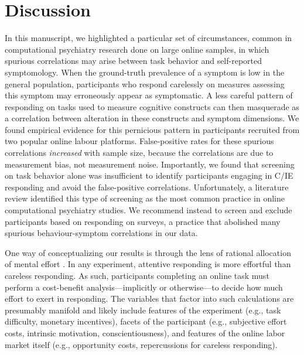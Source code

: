 \documentclass[a4paper,notitlepage,12pt]{article}
\begin{document}
\section{Discussion}

In this manuscript, we highlighted a particular set of circumstances, common in computational psychiatry research done on large online samples, in which spurious correlations may arise between task behavior and self-reported symptomology. When the ground-truth prevalence of a symptom is low in the general population, participants who respond carelessly on measures assessing this symptom may erroneously appear as symptomatic. A less careful pattern of responding on tasks used to measure cognitive constructs can then masquerade as a correlation between alteration in these constructs and symptom dimensions. We found empirical evidence for this pernicious pattern in participants recruited from two popular online labour platforms. False-positive rates for these spurious correlations \emph{increased} with sample size, because the correlations are due to measurement bias, not measurement noise. Importantly, we found that screening on task behavior alone was insufficient to identify participants engaging in C/IE responding and avoid the false-positive correlations. Unfortunately, a literature review identified this type of screening as the most common practice in online computational psychiatry studies. We recommend instead to screen and exclude participants based on responding on surveys, a practice that abolished many spurious behaviour-symptom correlations in our data. 

One way of conceptualizing our results is through the lens of rational allocation of mental effort \cite{kool2018mental}. In any experiment, attentive responding is more effortful than careless responding. As such, participants completing an online task must perform a cost-benefit analysis---implicitly or otherwise---to decide how much effort to exert in responding. The variables that factor into such calculations are presumably manifold and likely include features of the experiment (e.g., task difficulty, monetary incentives), facets of the participant (e.g., subjective effort costs, intrinsic motivation, conscientiousness), and features of the online labor market itself (e.g., opportunity costs, repercussions for careless responding). 
\end{document}
